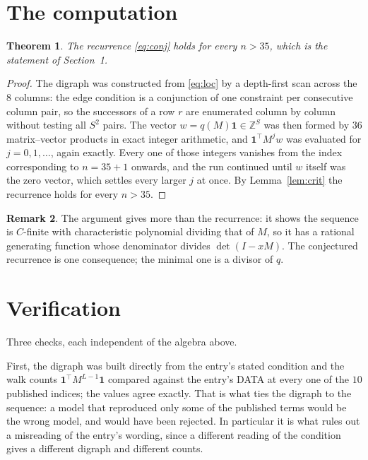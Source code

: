 \documentclass[11pt,a4paper]{article}
\theoremstyle{plain}
\newtheorem{theorem}{Theorem}
\theoremstyle{definition}
\newtheorem{remark}[theorem]{Remark}
\begin{document}
\section{The computation}

\begin{theorem}
The recurrence \eqref{eq:conj} holds for every $n>35$, which is the statement of
Section~1.
\end{theorem}

\begin{proof}
The digraph was constructed from \eqref{eq:loc} by a depth-first scan across the $8$
columns: the edge condition is a conjunction of one constraint per consecutive column
pair, so the successors of a row $r$ are enumerated column by column without testing all
$S^2$ pairs. The vector $w=q(M)\mathbf{1}\in\mathbb{Z}^{S}$ was then formed by $36$
matrix--vector products in exact integer arithmetic, and $\mathbf{1}^{\!\top}M^{j}w$ was
evaluated for $j=0,1,\dots$, again exactly. Every one of those integers vanishes from the
index corresponding to $n=35+1$ onwards, and the run continued until $w$ itself was the
zero vector, which settles every larger $j$ at once. By Lemma~\ref{lem:crit} the recurrence
holds for every $n>35$.
\end{proof}

\begin{remark}
The argument gives more than the recurrence: it shows the sequence is $C$-finite with
characteristic polynomial dividing that of $M$, so it has a rational generating function
whose denominator divides $\det(I-xM)$. The conjectured recurrence is one consequence; the
minimal one is a divisor of $q$.
\end{remark}

\section{Verification}

Three checks, each independent of the algebra above.

First, the digraph was built directly from the entry's stated condition and the walk counts
$\mathbf{1}^{\!\top}M^{L-1}\mathbf{1}$ compared against the entry's DATA at
every one of the $10$ published indices; the values agree exactly. That is what ties
the digraph to the sequence: a model that reproduced only some of the published terms would
be the wrong model, and would have been rejected. In particular it is what rules out a
misreading of the entry's wording, since a different reading of the condition gives a
different digraph and different counts.
\end{document}
